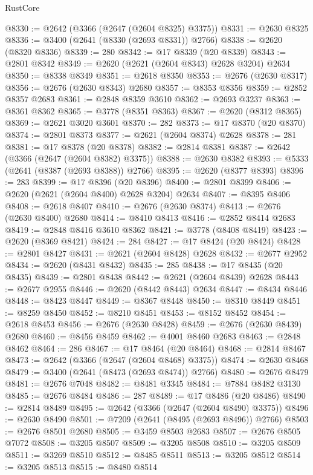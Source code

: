 \begin{lexlean}{RustCore}
\begin{coremodule}
@8330 := @2642 (@3366 (@2647 (@2604 @8325) @3375))
@8331 := @2630 @8325
@8336 := @3400 (@2641 (@8330 (@2693 @8331)) @2766)
@8338 := @2620 (@8320 @8336)
@8339 := 280
@8342 := @17 @8339 (@20 @8339)
@8343 := @2801 @8342
@8349 := @2620 (@2621 (@2604 @8343) @2628 @3204) @2634
@8350 := @8338 @8349
@8351 := @2618 @8350
@8353 := @2676 (@2630 @8317)
@8356 := @2676 (@2630 @8343) @2680
@8357 := @8353 @8356
@8359 := @2852 @8357 @2683
@8361 := @2848 @8359 @3610
@8362 := @2693 @3237
@8363 := @8361 @8362
@8365 := @3778 (@8351 @8363)
@8367 := @2620 (@8312 @8365)
@8369 := @2621 @3020 @3601
@8370 := 282
@8373 := @17 @8370 (@20 @8370)
@8374 := @2801 @8373
@8377 := @2621 (@2604 @8374) @2628
@8378 := 281
@8381 := @17 @8378 (@20 @8378)
@8382 := @2814 @8381
@8387 := @2642 (@3366 (@2647 (@2604 @8382) @3375))
@8388 := @2630 @8382
@8393 := @5333 (@2641 (@8387 (@2693 @8388)) @2766)
@8395 := @2620 (@8377 @8393)
@8396 := 283
@8399 := @17 @8396 (@20 @8396)
@8400 := @2801 @8399
@8406 := @2620 (@2621 (@2604 @8400) @2628 @3204) @2634
@8407 := @8395 @8406
@8408 := @2618 @8407
@8410 := @2676 (@2630 @8374)
@8413 := @2676 (@2630 @8400) @2680
@8414 := @8410 @8413
@8416 := @2852 @8414 @2683
@8419 := @2848 @8416 @3610 @8362
@8421 := @3778 (@8408 @8419)
@8423 := @2620 (@8369 @8421)
@8424 := 284
@8427 := @17 @8424 (@20 @8424)
@8428 := @2801 @8427
@8431 := @2621 (@2604 @8428) @2628
@8432 := @2677 @2952
@8434 := @2620 (@8431 @8432)
@8435 := 285
@8438 := @17 @8435 (@20 @8435)
@8439 := @2801 @8438
@8442 := @2621 (@2604 @8439) @2628
@8443 := @2677 @2955
@8446 := @2620 (@8442 @8443) @2634
@8447 := @8434 @8446
@8448 := @8423 @8447
@8449 := @8367 @8448
@8450 := @8310 @8449
@8451 := @8259 @8450
@8452 := @8210 @8451
@8453 := @8152 @8452
@8454 := @2618 @8453
@8456 := @2676 (@2630 @8428)
@8459 := @2676 (@2630 @8439) @2680
@8460 := @8456 @8459
@8462 := @4001 @8460 @2683
@8463 := @2848 @8462
@8464 := 286
@8467 := @17 @8464 (@20 @8464)
@8468 := @2814 @8467
@8473 := @2642 (@3366 (@2647 (@2604 @8468) @3375))
@8474 := @2630 @8468
@8479 := @3400 (@2641 (@8473 (@2693 @8474)) @2766)
@8480 := @2676 @8479
@8481 := @2676 @7048
@8482 := @8481 @3345
@8484 := @7884 @8482 @3130
@8485 := @2676 @8484
@8486 := 287
@8489 := @17 @8486 (@20 @8486)
@8490 := @2814 @8489
@8495 := @2642 (@3366 (@2647 (@2604 @8490) @3375))
@8496 := @2630 @8490
@8501 := @7209 (@2641 (@8495 (@2693 @8496)) @2766)
@8503 := @2676 @8501 @2680
@8505 := @3459 @8503 @2683
@8507 := @2676 @8505 @7072
@8508 := @3205 @8507
@8509 := @3205 @8508
@8510 := @3205 @8509
@8511 := @3269 @8510
@8512 := @8485 @8511
@8513 := @3205 @8512
@8514 := @3205 @8513
@8515 := @8480 @8514

\end{coremodule}
\end{lexlean}

